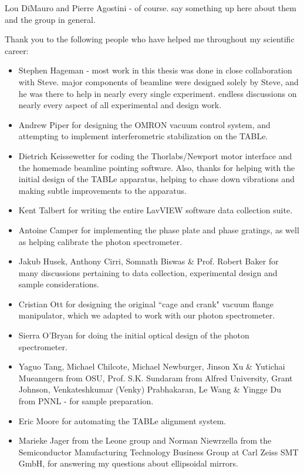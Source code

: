 \begin{acknowledgments}

Lou DiMauro and Pierre Agostini - of course. say something up here about them and the group in general.

Thank you to the following people who have helped me throughout my scientific career:

\begin{itemize}
	\item Stephen Hageman - most work in this thesis was done in close collaboration with Steve. major components of beamline were designed solely by Steve, and he was there to help in nearly every single experiment. endless discussions on nearly every aspect of all experimental and design work.
	\item Andrew Piper for designing the OMRON vacuum control system, and attempting to implement interferometric stabilization on the TABLe.
	\item Dietrich Keissewetter for coding the Thorlabs/Newport motor interface and the homemade beamline pointing software. Also, thanks for helping with the initial design of the TABLe apparatus, helping to chase down vibrations and making subtle improvements to the apparatus.
	\item Kent Talbert for writing the entire LavVIEW software data collection suite.
	\item Antoine Camper for implementing the phase plate and phase gratings, as well as helping calibrate the photon spectrometer.
	\item Jakub Husek, Anthony Cirri, Somnath Biswas \& Prof. Robert Baker for many discussions pertaining to data collection, experimental design and sample considerations.
	\item Cristian Ott for designing the original ``cage and crank" vacuum flange manipulator, which we adapted to work with our photon spectrometer.
	\item Sierra O'Bryan for doing the initial optical design of the photon spectrometer.
	\item Yaguo Tang, Michael Chilcote, Michael Newburger, Jinson Xu \& Yutichai Mueanngern from OSU, Prof. S.K. Sundaram from Alfred University, Grant Johnson, Venkateshkumar (Venky) Prabhakaran, Le Wang \& Yingge Du from PNNL - for sample preparation.
	\item Eric Moore for automating the TABLe alignment system.
	\item Marieke Jager from the Leone group and Norman Niewrzella from the Semiconductor Manufacturing Technology Business Group at Carl Zeiss SMT GmbH, for answering my questions about ellipsoidal mirrors.

\end{itemize}
\end{acknowledgments}
